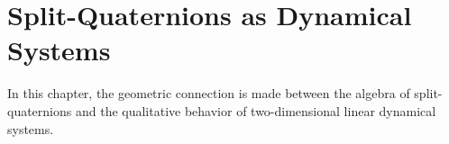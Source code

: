 \chapter{Split-Quaternions as Dynamical Systems}
\label{chap:quaternion}

In this chapter, the geometric connection is made between the algebra of split-quaternions and the qualitative behavior of two-dimensional linear dynamical systems. 





%
